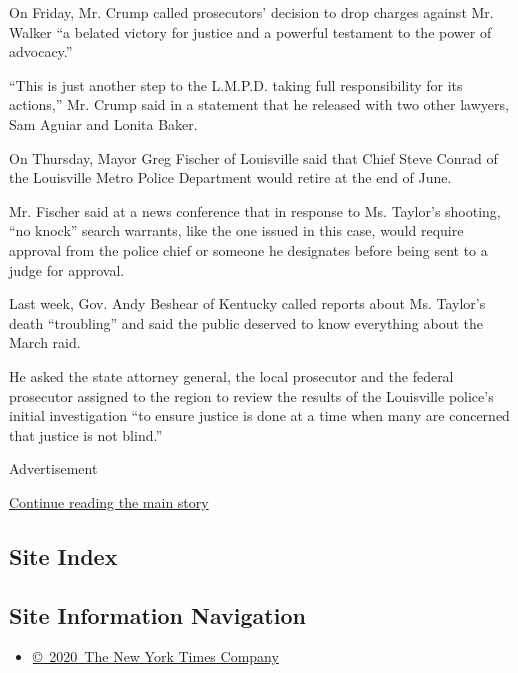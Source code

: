 On Friday, Mr. Crump called prosecutors' decision to drop charges
against Mr. Walker ``a belated victory for justice and a powerful
testament to the power of advocacy.''

``This is just another step to the L.M.P.D. taking full responsibility
for its actions,'' Mr. Crump said in a statement that he released with
two other lawyers, Sam Aguiar and Lonita Baker.

On Thursday, Mayor Greg Fischer of Louisville said that Chief Steve
Conrad of the Louisville Metro Police Department would retire at the end
of June.

Mr. Fischer said at a news conference that in response to Ms. Taylor's
shooting, ``no knock'' search warrants, like the one issued in this
case, would require approval from the police chief or someone he
designates before being sent to a judge for approval.

Last week, Gov. Andy Beshear of Kentucky called reports about Ms.
Taylor's death ``troubling'' and said the public deserved to know
everything about the March raid.

He asked the state attorney general, the local prosecutor and the
federal prosecutor assigned to the region to review the results of the
Louisville police's initial investigation ``to ensure justice is done at
a time when many are concerned that justice is not blind.''

Advertisement

\protect\hyperlink{after-bottom}{Continue reading the main story}

\hypertarget{site-index}{%
\subsection{Site Index}\label{site-index}}

\hypertarget{site-information-navigation}{%
\subsection{Site Information
Navigation}\label{site-information-navigation}}

\begin{itemize}
\tightlist
\item
  \href{https://help.nytimes3xbfgragh.onion/hc/en-us/articles/115014792127-Copyright-notice}{©~2020~The
  New York Times Company}
\end{itemize}

